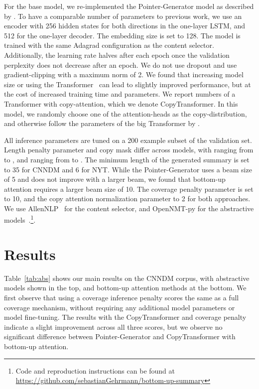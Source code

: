\documentclass[11pt,a4paper]{article}
\begin{document}
For the base model, we re-implemented the Pointer-Generator model as described by \citet{see2017get}. To have a comparable number of parameters to previous work, we use an encoder with 256 hidden states for both directions in the one-layer LSTM, and 512 for the one-layer decoder. The embedding size is set to 128. 
The model is trained with the same Adagrad configuration as the content selector. Additionally, the learning rate halves after each epoch once the validation perplexity does not decrease after an epoch. We do not use dropout and use gradient-clipping with a maximum norm of 2.
We found that increasing model size or using the Transformer~\citep{vaswani2017attention} can lead to slightly improved performance, but at the cost of increased training time and parameters. 
We report numbers of a Transformer with copy-attention, which we denote CopyTransformer. In this model, we randomly choose one of the attention-heads as the copy-distribution, and otherwise follow the parameters of the big Transformer by \citet{vaswani2017attention}.

All inference parameters are tuned on a 200 example subset of the validation set. Length penalty parameter  and copy mask  differ across models, with  ranging from  to , and  ranging from  to . The minimum length of the generated summary is set to 35 for \gls{CNNDM} and 6 for NYT. While the Pointer-Generator uses a beam size of 5 and does not improve with a larger beam, we found that bottom-up attention requires a larger beam size of 10. The coverage penalty parameter  is set to 10, and the copy attention normalization parameter  to 2 for both approaches. 
We use AllenNLP~\citep{gardner2018allennlp} for the content selector, and OpenNMT-py for the abstractive models~\citep{klein2017opennmt}.\footnote{Code and reproduction instructions can be found at \url{https://github.com/sebastianGehrmann/bottom-up-summary}}.


\section{Results}

Table~\ref{tab:abs} shows our main results on the \gls{CNNDM} corpus, with abstractive models shown in the top, and bottom-up attention methods at the bottom. We first observe that using a coverage inference penalty scores the same as a full coverage mechanism, without requiring any additional model parameters or model fine-tuning. The results with the CopyTransformer and coverage penalty indicate a slight improvement across all three scores, but we observe no significant difference between Pointer-Generator and CopyTransformer with bottom-up attention. 
\end{document}
